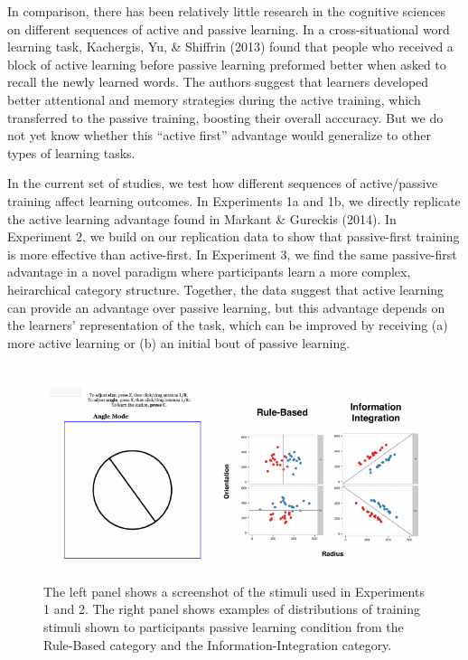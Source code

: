 \documentclass[10pt, letterpaper]{article}
\newenvironment{CodeChunk}{}{}
\begin{document}
In comparison, there has been relatively little research in the
cognitive sciences on different sequences of active and passive
learning. In a cross-situational word learning task, Kachergis, Yu, \&
Shiffrin (2013) found that people who received a block of active
learning before passive learning preformed better when asked to recall
the newly learned words. The authors suggest that learners developed
better attentional and memory strategies during the active training,
which transferred to the passive training, boosting their overall
acccuracy. But we do not yet know whether this ``active first''
advantage would generalize to other types of learning tasks.

In the current set of studies, we test how different sequences of
active/passive training affect learning outcomes. In Experiments 1a and
1b, we directly replicate the active learning advantage found in Markant
\& Gureckis (2014). In Experiment 2, we build on our replication data to
show that passive-first training is more effective than active-first. In
Experiment 3, we find the same passive-first advantage in a novel
paradigm where participants learn a more complex, heirarchical category
structure. Together, the data suggest that active learning can provide
an advantage over passive learning, but this advantage depends on the
learners' representation of the task, which can be improved by receiving
(a) more active learning or (b) an initial bout of passive learning.

\begin{CodeChunk}
\captionsetup{width=0.8\textwidth}\begin{figure}[t]

{\centering \includegraphics{figs/stimuli_exp1-1} 

}

\caption[The left panel shows a screenshot of the stimuli used in Experiments 1 and 2]{The left panel shows a screenshot of the stimuli used in Experiments 1 and 2. The right panel shows examples of distributions of training stimuli shown to participants passive learning condition from the Rule-Based category and the Information-Integration category.}\label{fig:stimuli_exp1}
\end{figure}
\end{CodeChunk}
\end{document}
